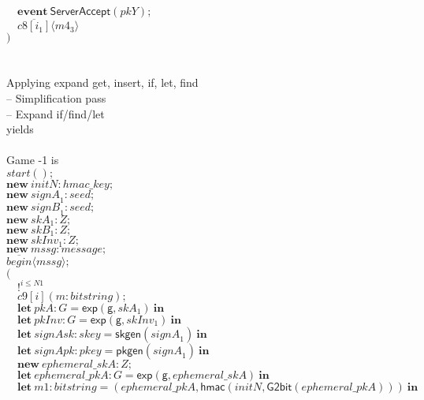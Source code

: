 \documentclass{article}
\newcommand{\cinput}[2]{{#1}({#2})}
\newcommand{\coutput}[2]{\overline{#1}\langle{#2}\rangle}
\newcommand{\kw}[1]{\mathbf{#1}}
\newcommand{\kwf}[1]{\mathsf{#1}}
\newcommand{\var}[1]{\mathit{#1}}
\newcommand{\kwt}[1]{\mathit{#1}}
\newcommand{\kwp}[1]{\mathit{#1}}
\newcommand{\kwc}[1]{\mathit{#1}}
\begin{document}
\begin{tabbing}
\>$\quad \kw{event}\ \kwf{ServerAccept}(\var{pkY});$\\
\>$\quad \coutput{\kwc{c8}[\var{i}_{1}]}{\var{m4}_{3}}$\\
\>$)$\\
\\
\\
Applying expand get, insert, if, let, find\\
\quad -- Simplification pass\\
\quad -- Expand if/find/let\\
yields\\
\\
Game -1 is\\
\>$\cinput{\kwc{start}}{};$\\
\>$\kw{new}\ \var{initN}: \kwt{hmac{\_}key};$\\
\>$\kw{new}\ \var{signA}_{1}: \kwt{seed};$\\
\>$\kw{new}\ \var{signB}_{1}: \kwt{seed};$\\
\>$\kw{new}\ \var{skA}_{1}: \kwt{Z};$\\
\>$\kw{new}\ \var{skB}_{1}: \kwt{Z};$\\
\>$\kw{new}\ \var{skInv}_{1}: \kwt{Z};$\\
\>$\kw{new}\ \var{mssg}: \kwt{message};$\\
\>$\coutput{\kwc{begin}}{\var{mssg}};$\\
\>$($\\
\>$\quad !^{\var{i} \leq \kwp{N1}}$\\
\>$\quad \cinput{\kwc{c9}[\var{i}]}{\var{m}: \kwt{bitstring}};$\\
\>$\quad \kw{let}\ \var{pkA}: \kwt{G} = \kwf{exp}(\kwf{g}, \var{skA}_{1})\ \kw{in}$\\
\>$\quad \kw{let}\ \var{pkInv}: \kwt{G} = \kwf{exp}(\kwf{g}, \var{skInv}_{1})\ \kw{in}$\\
\>$\quad \kw{let}\ \var{signAsk}: \kwt{skey} = \kwf{skgen}(\var{signA}_{1})\ \kw{in}$\\
\>$\quad \kw{let}\ \var{signApk}: \kwt{pkey} = \kwf{pkgen}(\var{signA}_{1})\ \kw{in}$\\
\>$\quad \kw{new}\ \var{ephemeral{\_}skA}: \kwt{Z};$\\
\>$\quad \kw{let}\ \var{ephemeral{\_}pkA}: \kwt{G} = \kwf{exp}(\kwf{g}, \var{ephemeral{\_}skA})\ \kw{in}$\\
\>$\quad \kw{let}\ \var{m1}: \kwt{bitstring} = \kwf{}(\var{ephemeral{\_}pkA}, \kwf{hmac}(\var{initN}, \kwf{G2bit}(\var{ephemeral{\_}pkA})))\ \kw{in}$\\

\end{tabbing}
\end{document}
